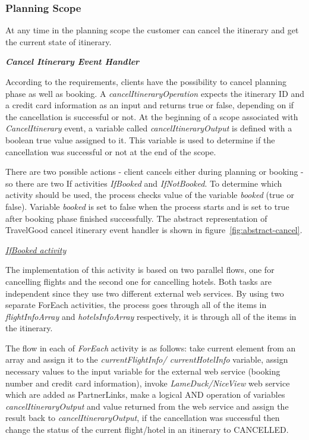 \subsubsection*{Planning Scope}

At any time in the planning scope the customer can cancel the itinerary and get the current state of itinerary.

\textbf{\textit{Cancel Itinerary Event Handler}}

According to the requirements, clients have the possibility to cancel planning phase as well as booking. A \textit{cancelItineraryOperation} expects the itinerary ID and a credit card information as an input and returns true or false, depending on if the cancellation is successful or not. At the beginning  of a scope associated with \textit{CancelItinerary} event, a variable called \textit{cancelItineraryOutput} is defined with a boolean true value assigned to it. This variable is used to determine if the cancellation was successful or not at the end of the scope.

There are two possible actions - client cancels either during planning or booking - so there are two If activities \textit{IfBooked} and \textit{IfNotBooked}. To determine which activity should be used, the process checks value of the variable \textit{booked} (true or false). Variable \textit{booked} is set to false when the process starts and is set to true after booking phase finished successfully. The abstract representation of TravelGood cancel itinerary event handler is shown in figure~\ref{fig:abstract-cancel}.

\underline{\textit{IfBooked activity}}

The implementation of this activity is based on two parallel flows, one for cancelling flights and the second one for cancelling hotels. Both tasks are independent since they use two different external web services. By using two separate ForEach activities, the process goes through all of the items in \textit{flightInfoArray} and \textit{hotelsInfoArray} respectively, it is through all of the items in the itinerary.

The flow in each of \textit{ForEach} activity is as follows:
take current element from an array and assign it to the \textit{currentFlightInfo/ currentHotelInfo} variable,
assign necessary values to the input variable for the external web service (booking number and credit card information),
invoke\textit{ LameDuck/NiceView} web service which are added as PartnerLinks,
make a logical AND operation of variables \textit{cancelItineraryOutput} and value returned from the web service and assign the result back to \textit{cancelItineraryOutput},
if the cancellation was successful then change the status of the current flight/hotel in an itinerary to CANCELLED.

